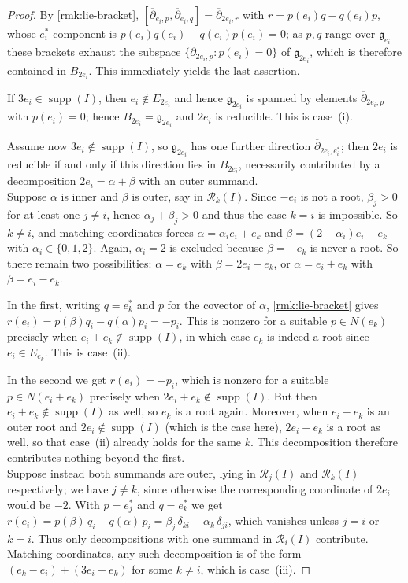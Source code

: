 \documentclass[11pt,letterpaper,reqno]{amsart}
\theoremstyle{remark}
\theoremstyle{definition}
\newcommand{\supp}[0]{\ensuremath{\operatorname{supp}}}
\newcommand{\R}{\mathcal R}
\begin{document}
\begin{proof}
By \cref{rmk:lie-bracket},
$[\overline\partial_{e_i,p},\overline\partial_{e_i,q}]
=\overline\partial_{2e_i,r}$ with $r=p(e_i)q-q(e_i)p$, whose $e_i^*$-component is $p(e_i)q(e_i)-q(e_i)p(e_i)=0$; as $p,q$ range over $\mathfrak g_{e_i}$ these brackets exhaust the subspace $\{\overline\partial_{2e_i,p}:p(e_i)=0\}$ of $\mathfrak g_{2e_i}$, which is therefore contained in $B_{2e_i}$. This immediately yields the last assertion.

If $3e_i\in\supp(I)$, then $e_i\notin E_{2e_i}$ and hence $\mathfrak g_{2e_i}$ is spanned by elements $\overline\partial_{2e_i,p}$ with $p(e_i)=0$; hence $B_{2e_i}=\mathfrak g_{2e_i}$ and $2e_i$ is reducible. This
is case~(i).

Assume now $3e_i\notin\supp(I)$, so $\mathfrak g_{2e_i}$ has one further
direction $\overline\partial_{2e_i,e_i^*}$; then $2e_i$ is
reducible if and only if this direction lies in $B_{2e_i}$, necessarily
contributed by a decomposition $2e_i=\alpha+\beta$ with an outer summand.\\

Suppose $\alpha$ is inner and $\beta$ is outer, say in $\R_k(I)$. Since $-e_i$ is not a root, $\beta_j>0$ for at least one $j\neq i$, hence $\alpha_j+\beta_j>0$ and thus the case $k=i$ is impossible. So $k\neq i$, and matching coordinates forces $\alpha=\alpha_ie_i+e_k$ and
$\beta=(2-\alpha_i)e_i-e_k$ with $\alpha_i\in\{0,1,2\}$. Again, $\alpha_i=2$ is excluded because $\beta=-e_k$ is never a root. So there remain two possibilities: $\alpha=e_k$ with $\beta=2e_i-e_k$, or $\alpha=e_i+e_k$ with $\beta=e_i-e_k$.

In the first, writing $q=e_k^*$ and $p$ for the covector of $\alpha$, \cref{rmk:lie-bracket} gives $r(e_i)=p(\beta)q_i-q(\alpha)p_i=-p_i$. This is nonzero for a suitable $p\in N(e_k)$ precisely when $e_i+e_k\notin\supp(I)$, in which case $e_k$ is indeed a root since $e_i\in E_{e_k}$. This is case~(ii).

In the second we get $r(e_i)=-p_i$, which is nonzero for a suitable $p\in N(e_i+e_k)$ precisely when $2e_i+e_k\notin\supp(I)$. But then
$e_i+e_k\notin\supp(I)$ as well, so $e_k$ is a root again. Moreover, when $e_i-e_k$ is an outer root and $2e_i\notin\supp(I)$ (which is the case here), $2e_i-e_k$ is a root as well, so that case~(ii) already holds for the same $k$. This decomposition therefore contributes nothing beyond the first.\\

Suppose instead both summands are outer, lying in $\R_j(I)$ and $\R_k(I)$ respectively;
we have $j\neq k$, since otherwise the corresponding coordinate of $2e_i$
would be $-2$. With $p=e_j^*$ and $q=e_k^*$ we get $r(e_i)=p(\beta)\,q_i-q(\alpha)\,p_i=\beta_j\,\delta_{ki}-\alpha_k\,\delta_{ji}$, which vanishes unless $j=i$ or $k=i$. Thus only decompositions with one
summand in $\R_i(I)$ contribute. Matching coordinates,
any such decomposition is of the form $(e_k-e_i)+(3e_i-e_k)$ for some $k\neq i$, which is case~(iii).
\end{proof}
\end{document}
